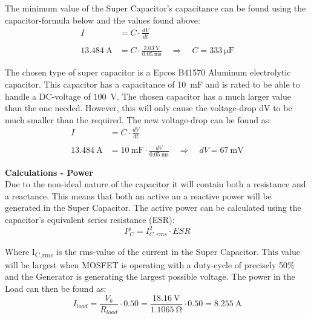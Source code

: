 The minimum value of the Super Capacitor's capacitance can be found using the capacitor-formula below and the values found above:
\begin{equation}
	\begin{split}
		I &= C \cdot \frac{dV}{dt}\\
		\\
		\SI{13.484}{\ampere} &= C \cdot \frac{\SI{2.03}{\volt}}{\SI{0.05}{\milli \second}} \quad \Rightarrow \quad C = \SI{333}{\micro \farad}
	\end{split}
\end{equation}

The chosen type of super capacitor is a Epcos B41570 Aluminum electrolytic capacitor\cite{SuperCapacitor}. This capacitor has a capacitance of \SI{10}{\milli \farad} and is rated to be able to handle a DC-voltage of \SI{100}{\volt}. The chosen capacitor has a much larger value than the one needed. However, this will only cause the voltage-drop dV to be much smaller than the required. The new voltage-drop can be found as:
\begin{equation}
	\begin{split}
		I &= C \cdot \frac{dV}{dt}\\
		\\
	\SI{13.484}{\ampere} &= \SI{10}{\milli \farad} \cdot \frac{dV}{\SI{0.05}{\milli \second}} \quad \Rightarrow \quad dV = \SI{67}{\milli \volt}
	\end{split}
\end{equation}

\textbf{Calculations - Power}\\
Due to the non-ideal nature of the capacitor it will contain both a resistance and a reactance. This means that both an active an a reactive power will be generated in the Super Capacitor. The active power can be calculated using the capacitor's equivalent series resistance (ESR)\cite{SuperCapacitor}:
\begin{equation}
	P_C = I_{C,rms}^2 \cdot ESR
\end{equation}

Where I\textsubscript{C,rms} is the rms-value of the current in the Super Capacitor. This value will be largest when MOSFET is operating with a duty-cycle of precisely 50\% and the Generator is generating the largest possible voltage. The power in the Load can then be found as:
\begin{equation}
	I_{load} = \frac{V_b}{R_{load}} \cdot 0.50 = \frac{\SI{18.16}{\volt}}{\SI{1.1065}{\ohm}} \cdot 0.50 = \SI{8.255}{\ampere}
\end{equation}


